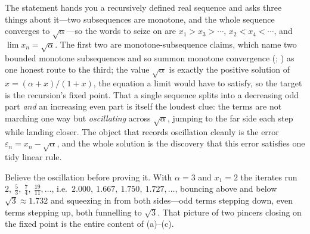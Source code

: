 \documentclass[main.tex]{subfiles}
\begin{document}
\begin{Reflection}
The statement hands you a recursively defined real sequence and asks three things about it---two
subsequences are monotone, and the whole sequence converges to $\sqrt\alpha$---so the words to seize on
are \emph{$x_{1}>x_{3}>\cdots$}, \emph{$x_{2}<x_{4}<\cdots$}, and \emph{$\lim x_{n}=\sqrt\alpha$}. The
first two are monotone-subsequence claims, which name two bounded monotone subsequences and so summon
monotone convergence (; ) as one
honest route to the third; the value $\sqrt\alpha$ is exactly the positive solution of $x=(\alpha+x)/(1+x)$,
the equation a limit would have to satisfy, so the target is the recursion's fixed point. That a single
sequence splits into a decreasing odd part \emph{and} an increasing even part is itself the loudest clue:
the terms are not marching one way but \emph{oscillating} across $\sqrt\alpha$, jumping to the far side
each step while landing closer. The object that records oscillation cleanly is the error
$\varepsilon_{n}=x_{n}-\sqrt\alpha$, and the whole solution is the discovery that this error satisfies one
tidy linear rule.

Believe the oscillation before proving it. With $\alpha=3$ and $x_{1}=2$ the iterates run
$2,\ \tfrac53,\ \tfrac74,\ \tfrac{19}{11},\dots$, i.e.\ $2.000,\ 1.667,\ 1.750,\ 1.727,\dots$, bouncing
above and below $\sqrt3\approx1.732$ and squeezing in from both sides---odd terms stepping down, even
terms stepping up, both funnelling to $\sqrt3$. That picture of two pincers closing on the fixed point is
the entire content of (a)--(c).


\end{Reflection}
\end{document}
